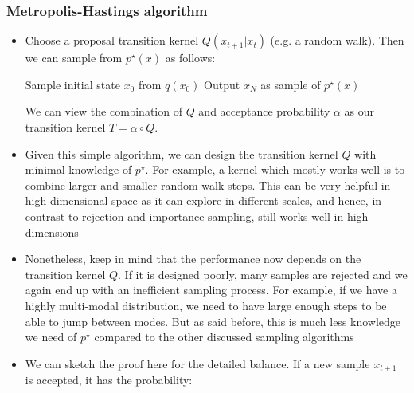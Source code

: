 \subsubsection{Metropolis-Hastings algorithm}
\begin{itemize}
	\item Choose a proposal transition kernel $Q(x_{t+1}|x_{t})$ (e.g. a random walk). Then we can sample from $p^{\star}(x)$ as follows:
	\begin{tcolorbox}[colback=white!85!gray,colframe=gray!75!black,title=Pseudocode for Metropolis-Hastings algorithm]
		\begin{algorithm}[H]
			\SetAlgoLined
			Sample initial state $x_0$ from $q(x_0)$\;
			Output $x_N$ as sample of $p^{\star}(x)$\;
		\end{algorithm}
	\end{tcolorbox}	
	We can view the combination of $Q$ and acceptance probability $\alpha$ as our transition kernel $T=\alpha\circ Q$.
	\item Given this simple algorithm, we can design the transition kernel $Q$ with minimal knowledge of $p^{\star}$. For example, a kernel which mostly works well is to combine larger and smaller random walk steps. This can be very helpful in high-dimensional space as it can explore in different scales, and hence, in contrast to rejection and importance sampling, still works well in high dimensions
	\item Nonetheless, keep in mind that the performance now depends on the transition kernel $Q$. If it is designed poorly, many samples are rejected and we again end up with an inefficient sampling process. For example, if we have a highly multi-modal distribution, we need to have large enough steps to be able to jump between modes. But as said before, this is much less knowledge we need of $p^{\star}$ compared to the other discussed sampling algorithms
	\item We can sketch the proof here for the detailed balance. If a new sample $x_{t+1}$ is accepted, it has the probability:
	\begin{equation*}

\end{equation*}
\end{itemize}
